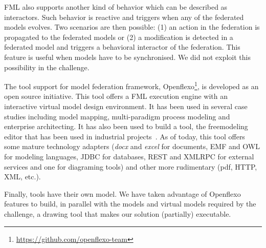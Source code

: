 FML also supports another kind of behavior which can be described as
interactors. Such behavior is reactive and triggers when any of the
federated models evolves. Two scenarios are then possible: (1) an
action in the federation is propagated to the federated models or (2)
a modification is detected in a federated model and triggers a
behavioral interactor of the federation.
This feature is useful when models have to be synchronised. We did not
exploit this possibility in the challenge.

The tool support for model federation framework,
Openflexo\footnote{\url{https://github.com/openflexo-team}}, is
developed as an open source initiative. This tool offers a FML
execution engine with an interactive virtual model design environment.
It has been used in several case studies including model mapping,
multi-paradigm process modeling and enterprise architecting. It has
also been used to build a tool, the freemodeling editor that has been
used in industrial projects~\cite{models2016-freemodel}. As of today, this tool
offers some mature technology adapters (\emph{docx} and \emph{excel}
for documents, EMF and OWL for modeling languages, JDBC for databases,
REST and XMLRPC for external services and one for diagraming tools)
and other more rudimentary (pdf, HTTP, XML, etc.).

Finally, tools have their own model. We have taken advantage of
Openflexo features to build, in parallel with the models and virtual
models required by the challenge, a drawing tool that makes our
solution (partially) executable.
